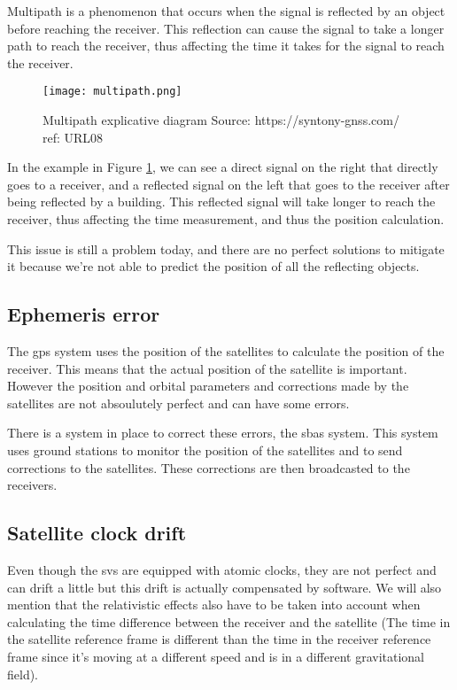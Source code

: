 Multipath is a phenomenon that occurs when the signal is reflected by an object before reaching the receiver. This reflection can cause the signal to take a longer path to reach the receiver, thus affecting the time it takes for the signal to reach the receiver.
\begin{figure}[H]
	\centering
	\texttt{[image: multipath.png]}
	\caption[Multipath explicative diagram]{Multipath explicative diagram Source: https://syntony-gnss.com/ ref: URL08}
	\label{fig:multipath}
\end{figure}

In the example in Figure \ref{fig:multipath}, we can see a direct signal on the right that directly goes to a receiver, and a reflected signal on the left that goes to the receiver after being reflected by a building. This reflected signal will take longer to reach the receiver, thus affecting the time measurement, and thus the position calculation.

This issue is still a problem today, and there are no perfect solutions to mitigate it because we're not able to predict the position of all the reflecting objects.


\subsection{Ephemeris error}

The \gls{gps} system uses the position of the satellites to calculate the position of the receiver. This means that the actual position of the satellite is important. However the position and orbital parameters and corrections made by the satellites are not absoulutely perfect and can have some errors.

There is a system in place to correct these errors, the \gls{sbas} system. This system uses ground stations to monitor the position of the satellites and to send corrections to the satellites. These corrections are then broadcasted to the receivers.


\subsection{Satellite clock drift}

Even though the \gls{sv}s are equipped with atomic clocks, they are not perfect and can drift a little but this drift is actually compensated by software. We will also mention that the relativistic effects also have to be taken into account when calculating the time difference between the receiver and the satellite (The time in the satellite reference frame is different than the time in the receiver reference frame since it's moving at a different speed and is in a different gravitational field).


